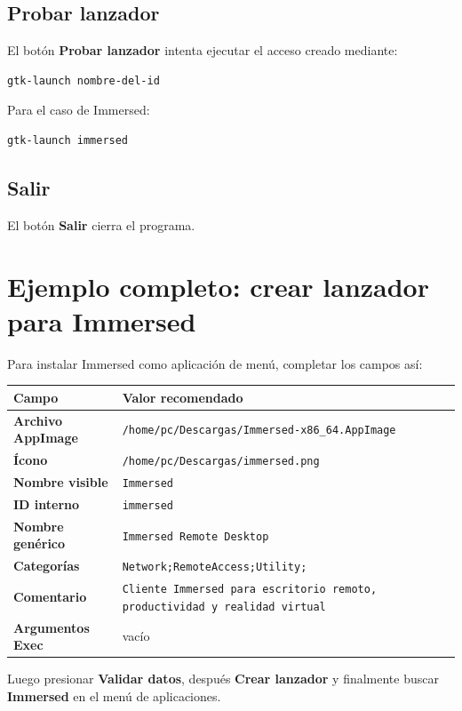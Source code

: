 \documentclass[11pt,a4paper]{article}
\begin{document}
\subsection{Probar lanzador}

El botón \textbf{Probar lanzador} intenta ejecutar el acceso creado mediante:

\begin{lstlisting}[style=bashstyle]
gtk-launch nombre-del-id
\end{lstlisting}

Para el caso de Immersed:

\begin{lstlisting}[style=bashstyle]
gtk-launch immersed
\end{lstlisting}

\subsection{Salir}

El botón \textbf{Salir} cierra el programa.

\section{Ejemplo completo: crear lanzador para Immersed}

Para instalar Immersed como aplicación de menú, completar los campos así:

\begin{longtable}{>{\bfseries}p{5cm}p{10cm}}
\toprule
Campo & Valor recomendado \\
\midrule
Archivo AppImage & \texttt{/home/pc/Descargas/Immersed-x86\_64.AppImage} \\
Ícono & \texttt{/home/pc/Descargas/immersed.png} \\
Nombre visible & \texttt{Immersed} \\
ID interno & \texttt{immersed} \\
Nombre genérico & \texttt{Immersed Remote Desktop} \\
Categorías & \texttt{Network;RemoteAccess;Utility;} \\
Comentario & \texttt{Cliente Immersed para escritorio remoto, productividad y realidad virtual} \\
Argumentos Exec & vacío \\
\bottomrule
\end{longtable}

Luego presionar \textbf{Validar datos}, después \textbf{Crear lanzador} y finalmente buscar \textbf{Immersed} en el menú de aplicaciones.
\end{document}
